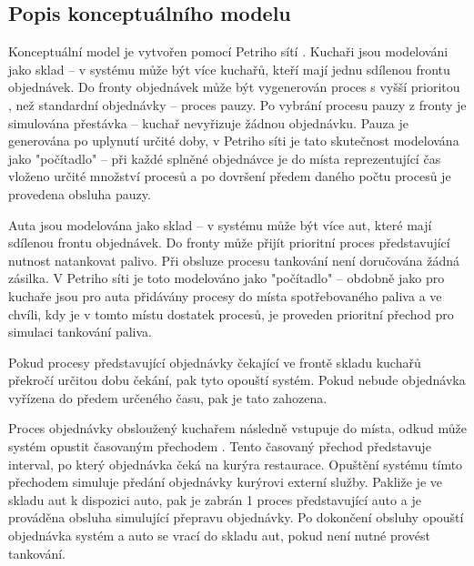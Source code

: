 \documentclass[a4paper, 11pt]{article}
\begin{document}
\subsection{Popis konceptuálního modelu}
Konceptuální model \cite[snímek 41]{IMS_course} je vytvořen pomocí Petriho sítí \cite[snímek 123]{IMS_course}. Kuchaři jsou modelováni jako sklad \cite[snímek 146]{IMS_course} -- v systému může být více kuchařů, kteří mají jednu sdílenou frontu \cite[snímek 138]{IMS_course} objednávek. Do fronty objednávek může být vygenerován proces \cite[snímek 121]{IMS_course} s vyšší prioritou \cite[snímek 178]{IMS_course}, než standardní objednávky -- proces pauzy. Po vybrání procesu pauzy z fronty je simulována přestávka -- kuchař nevyřizuje žádnou objednávku. Pauza je generována po uplynutí určité doby, v Petriho síti je tato skutečnost modelována jako "počítadlo" -- při každé splněné objednávce je do místa \cite[snímek 123]{IMS_course} reprezentující čas vloženo určité množství procesů a po dovršení předem daného počtu procesů je provedena obsluha \cite[snímek 136]{IMS_course} pauzy.

Auta jsou modelována jako sklad -- v systému může být více aut, které mají sdílenou frontu objednávek. Do fronty může přijít prioritní proces představující nutnost natankovat palivo. Při obsluze procesu tankování není doručována žádná zásilka. V Petriho síti je toto modelováno jako "počítadlo" -- obdobně jako pro kuchaře jsou pro auta přidávány procesy do místa spotřebovaného paliva a ve chvíli, kdy je v tomto místu dostatek procesů, je proveden prioritní přechod \cite[snímek 128]{IMS_course} pro simulaci tankování paliva. 

Pokud procesy představující objednávky čekající ve frontě skladu kuchařů překročí určitou dobu čekání, pak tyto opouští systém. Pokud nebude objednávka vyřízena do předem určeného času, pak je tato zahozena. 

Proces objednávky obsloužený kuchařem následně vstupuje do místa, odkud může systém opustit časovaným přechodem \cite[snímek 132]{IMS_course}. Tento časovaný přechod představuje interval, po který objednávka čeká na kurýra restaurace. Opuštění systému tímto přechodem simuluje předání objednávky kurýrovi externí služby. Pakliže je ve skladu aut k dispozici auto, pak je zabrán 1 proces představující auto a je prováděna obsluha simulující přepravu objednávky. Po dokončení obsluhy opouští objednávka systém a auto se vrací do skladu aut, pokud není nutné provést tankování. 

\newpage
\end{document}
